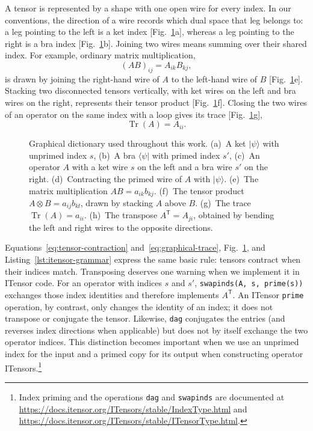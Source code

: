 A tensor is represented by a shape with one open wire for every index.
In our conventions, the direction of a wire records which dual space that leg belongs to: a leg pointing to the left is a ket index [Fig.~\ref{fig:graphical-dictionary}a], whereas a leg pointing to the right is a bra index [Fig.~\ref{fig:graphical-dictionary}b].
Joining two wires means summing over their shared index.
For example, ordinary matrix multiplication,
%
\begin{equation}
    (AB)_{ij}
    =
    A_{ik}B_{kj},
    \label{eq:tensor-contraction}
\end{equation}
%
is drawn by joining the right-hand wire of \(A\) to the left-hand wire of \(B\) [Fig.~\ref{fig:graphical-dictionary}e].
Stacking two disconnected tensors vertically, with ket wires on the left and bra wires on the right, represents their tensor product [Fig.~\ref{fig:graphical-dictionary}f].
Closing the two wires of an operator on the same index with a loop gives its trace [Fig.~\ref{fig:graphical-dictionary}g],
%
\begin{equation}
    \operatorname{Tr}(A)
    =
    A_{ii}.
    \label{eq:graphical-trace}
\end{equation}
%
\begin{figure}[H]
    \centering
    
    \caption{Graphical dictionary used throughout this work.
    (a)~A ket \(\lvert\psi\rangle\) with unprimed index \(s\), (b)~A bra \(\langle\psi\rvert\) with primed index \(s'\), (c)~An operator \(A\) with a ket wire \(s\) on the left and a bra wire \(s'\) on the right.
    (d)~Contracting the primed wire of \(A\) with \(\lvert\psi\rangle\).
    (e)~The matrix multiplication \(AB=a_{ik}b_{kj}\).
    (f)~The tensor product \(A\otimes B=a_{ij}b_{kl}\), drawn by stacking \(A\) above \(B\).
    (g)~The trace \(\operatorname{Tr}(A)=a_{ii}\).
    (h)~The transpose \(A^{\mathsf T}=A_{ji}\), obtained by bending the left and right wires to the opposite directions.}
    \label{fig:graphical-dictionary}
\end{figure}
%

Equations~\eqref{eq:tensor-contraction} and~\eqref{eq:graphical-trace}, Fig.~\ref{fig:graphical-dictionary}, and Listing~\ref{lst:itensor-grammar} express the same basic rule: tensors contract when their indices match.
Transposing deserves one warning when we implement it in ITensor code.
For an operator with indices \(s\) and \(s'\), \texttt{swapinds(A, s, prime(s))} exchanges those index identities and therefore implements \(A^{\mathsf T}\).
An ITensor \texttt{prime} operation, by contrast, only changes the identity of an index; it does not transpose or conjugate the tensor.
Likewise, \texttt{dag} conjugates the entries (and reverses index directions when applicable) but does not by itself exchange the two operator indices.
This distinction becomes important when we use an unprimed index for the input and a primed copy for its output when constructing operator ITensors.\footnote{Index priming and the operations \texttt{dag} and \texttt{swapinds} are documented at \url{https://docs.itensor.org/ITensors/stable/IndexType.html} and \url{https://docs.itensor.org/ITensors/stable/ITensorType.html}.}

